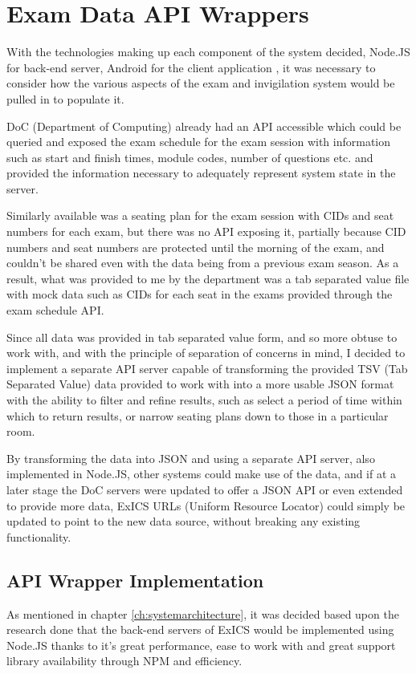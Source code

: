 \chapter{Exam Data API Wrappers}

\label{ch:apiwrappers}

With the technologies making up each component of the system decided, Node.JS for back-end server, Android for the client application , it was necessary to consider how the various aspects of the exam and invigilation system would be pulled in to populate it.

DoC (Department of Computing) already had an API accessible which could be queried and exposed the exam schedule for the exam session with information such as start and finish times, module codes, number of questions etc. and provided the information necessary to adequately represent system state in the server.

Similarly available was a seating plan for the exam session with CIDs and seat numbers for each exam, but there was no API exposing it, partially because CID numbers and seat numbers are protected until the morning of the exam, and couldn't be shared even with the data being from a previous exam season.  As a result, what was provided to me by the department was a tab separated value file with mock data such as CIDs for each seat in the exams provided through the exam schedule API.

Since all data was provided in tab separated value form, and so more obtuse to work with, and with the principle of separation of concerns \cite{sepofconcerns} in mind, I decided to implement a separate API server capable of transforming the provided TSV (Tab Separated Value) data provided to work with into a more usable JSON format with the ability to filter and refine results, such as select a period of time within which to return results, or narrow seating plans down to those in a particular room.

By transforming the data into JSON and using a separate API server, also implemented in Node.JS, other systems could make use of the data, and if at a later stage the DoC servers were updated to offer a JSON API or even extended to provide more data, ExICS URLs (Uniform Resource Locator) could simply be updated to point to the new data source, without breaking any existing functionality.

\section{API Wrapper Implementation}

As mentioned in chapter \ref{ch:systemarchitecture}, it was decided based upon the research done that the back-end servers of ExICS would be implemented using Node.JS thanks to it's great performance, ease to work with and great support library availability through NPM and efficiency.\cite{understandingNode}